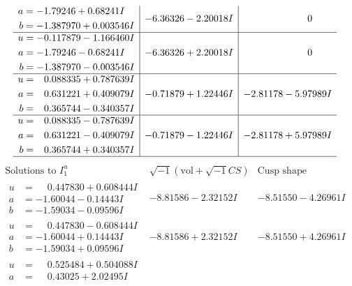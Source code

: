 \documentclass[1p]{elsarticle_modified}
\theoremstyle{definition}
\newcommand{\I}{\sqrt{-1}}
\begin{document}
$$\begin{array}{c|c|c}
\begin{aligned}
a &= -1.79246 + 0.68241 I \\
b &= -1.387970 + 0.003546 I\end{aligned}
 & -6.36326 - 2.20018 I & \phantom{-0.000000 } 0 \\ \hline\begin{aligned}
u &= -0.117879 - 1.166460 I \\
a &= -1.79246 - 0.68241 I \\
b &= -1.387970 - 0.003546 I\end{aligned}
 & -6.36326 + 2.20018 I & \phantom{-0.000000 } 0 \\ \hline\begin{aligned}
u &= \phantom{-}0.088335 + 0.787639 I \\
a &= \phantom{-}0.631221 + 0.409079 I \\
b &= \phantom{-}0.365744 - 0.340357 I\end{aligned}
 & -0.71879 + 1.22446 I & -2.81178 - 5.97989 I \\ \hline\begin{aligned}
u &= \phantom{-}0.088335 - 0.787639 I \\
a &= \phantom{-}0.631221 - 0.409079 I \\
b &= \phantom{-}0.365744 + 0.340357 I\end{aligned}
 & -0.71879 - 1.22446 I & -2.81178 + 5.97989 I\\
 \hline 
 \end{array}$$\newpage$$\begin{array}{c|c|c}  
\text{Solutions to }I^u_{1}& \I (\text{vol} + \sqrt{-1}CS) & \text{Cusp shape}\\
 \hline 
\begin{aligned}
u &= \phantom{-}0.447830 + 0.608444 I \\
a &= -1.60044 - 0.14443 I \\
b &= -1.59034 - 0.09596 I\end{aligned}
 & -8.81586 - 2.32152 I & -8.51550 - 4.26961 I \\ \hline\begin{aligned}
u &= \phantom{-}0.447830 - 0.608444 I \\
a &= -1.60044 + 0.14443 I \\
b &= -1.59034 + 0.09596 I\end{aligned}
 & -8.81586 + 2.32152 I & -8.51550 + 4.26961 I \\ \hline\begin{aligned}
u &= \phantom{-}0.525484 + 0.504088 I \\
a &= \phantom{-}0.43025 + 2.02495 I \\

\end{aligned}
\end{array}$$
\end{document}
